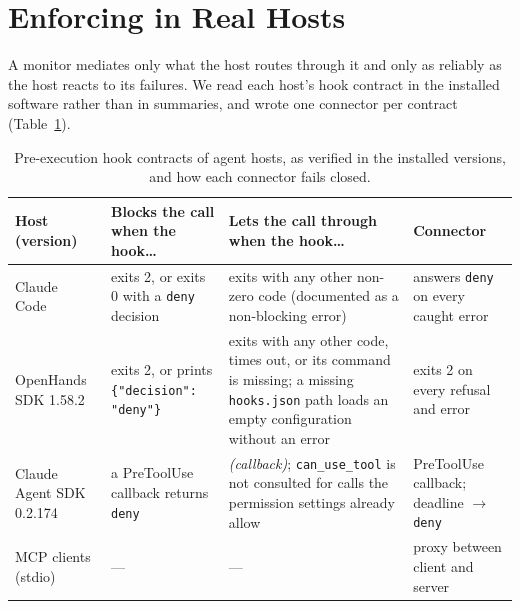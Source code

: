 \section{Enforcing in Real Hosts}
\label{sec:hosts}

A monitor mediates only what the host routes through it and only as reliably as the host reacts to its failures. We read each host's hook contract in the installed software rather than in summaries, and wrote one connector per contract (Table~\ref{tab:hosts}).

\begin{table}[t]
\centering
\caption{Pre-execution hook contracts of agent hosts, as verified in the installed versions, and how each connector fails closed.}
\label{tab:hosts}
\setlength{\tabcolsep}{4pt}
\begin{tabularx}{\textwidth}{lXXl}
\toprule
Host (version) & Blocks the call when the hook\ldots & Lets the call through when the hook\ldots & Connector \\
\midrule
Claude Code~\cite{claudehooks} & exits 2, or exits 0 with a \texttt{deny} decision & exits with any other non-zero code (documented as a non-blocking error) & answers \texttt{deny} on every caught error \\
OpenHands SDK 1.58.2 & exits 2, or prints \texttt{\{"decision": "deny"\}} & exits with any other code, times out, or its command is missing; a missing \texttt{hooks.json} path loads an empty configuration without an error & exits 2 on every refusal and error \\
Claude Agent SDK 0.2.174 & a PreToolUse callback returns \texttt{deny} & \emph{(callback)}; \texttt{can\_use\_tool} is not consulted for calls the permission settings already allow & PreToolUse callback; deadline $\to$ \texttt{deny} \\
MCP clients (stdio) & --- & --- & proxy between client and server \\
\bottomrule
\end{tabularx}
\end{table}

